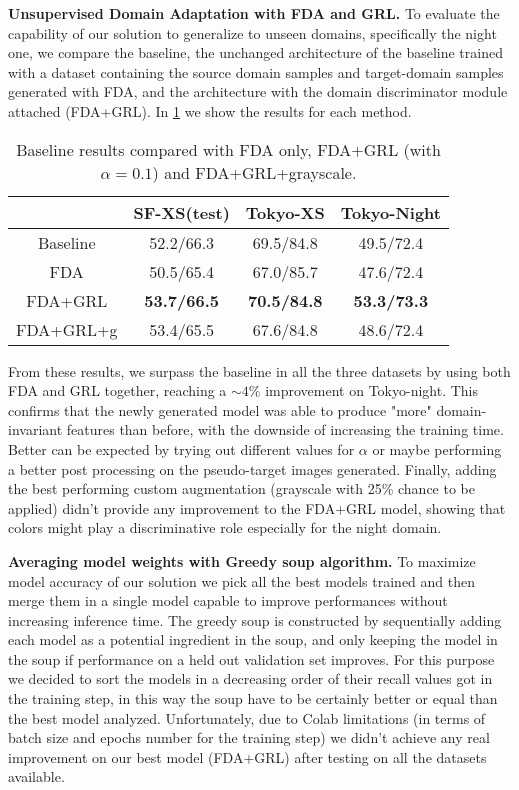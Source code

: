 \documentclass[10pt,twocolumn,letterpaper]{article}
\begin{document}
\textbf{Unsupervised Domain Adaptation with FDA and GRL.}
To evaluate the capability of our solution to generalize to unseen domains, specifically the night one, we compare the baseline, the unchanged architecture of the baseline trained with a dataset containing the source domain samples and target-domain samples generated with FDA, and the architecture with the domain discriminator module attached (FDA+GRL). In \cref{tab:fda+grl} we show the results for each method.

\begin{table}[htp]
  \centering
  \begin{tabular}{@{}cccc@{}}
    \toprule
    & SF-XS(test) & Tokyo-XS & Tokyo-Night\\
    \midrule
    Baseline & 52.2/66.3 & 69.5/84.8 & 49.5/72.4 \\
    FDA & 50.5/65.4 & 67.0/85.7 & 47.6/72.4 \\
    FDA+GRL & \textbf{53.7/66.5} & \textbf{70.5/84.8} & \textbf{53.3/73.3}\\
    FDA+GRL+g & 53.4/65.5 & 67.6/84.8 & 48.6/72.4\\
    \bottomrule
  \end{tabular}
  \caption{Baseline results compared with FDA only, FDA+GRL (with $\alpha=0.1$) and FDA+GRL+grayscale.}
  \label{tab:fda+grl}
\end{table}

From these results, we surpass the baseline in all the three datasets by using both FDA and GRL together, reaching a $\sim4\%$ improvement on Tokyo-night. This confirms that the newly generated model was able to produce "more" domain-invariant features than before, with the downside of increasing the training time. Better can be expected by trying out different values for $\alpha$ or maybe performing a better post processing on the pseudo-target images generated.
Finally, adding the best performing custom augmentation (grayscale with 25\% chance to be applied) didn't provide any improvement to the FDA+GRL model, showing that colors might play a discriminative role especially for the night domain.
\newline

\textbf{Averaging model weights with Greedy soup algorithm.}
To maximize model accuracy of our solution we pick all the best models trained and then merge them in a single model capable to improve performances without increasing inference time.
The greedy soup is constructed by sequentially adding each model as a potential ingredient in the soup, and only keeping the model in the soup if performance on a held out validation set improves.
For this purpose we decided to sort the models in a decreasing order of their recall values got in the training step, in this way the soup have to be certainly better or equal than the best model analyzed. 
Unfortunately, due to Colab limitations (in terms of batch size and epochs number for the training step) we didn't achieve any real improvement on our best model (FDA+GRL) after testing on all the datasets available.
\newline
\end{document}
